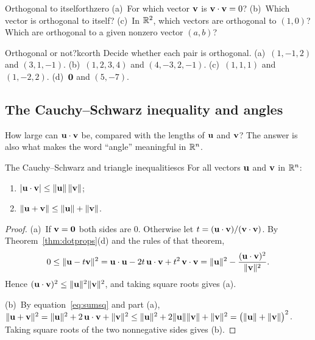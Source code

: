 \documentclass[11pt]{article}
\begin{document}
\begin{think}{Orthogonal to itself}{orthzero}
(a)~For which vector $\mathbf{v}$ is $\mathbf{v}\cdot\mathbf{v}=0$? (b)~Which vector is orthogonal to itself? (c)~In $\mathbb{R}^2$, which vectors are orthogonal to $(1,0)$? Which are orthogonal to a given nonzero vector $(a,b)$?
\end{think}

\begin{kc}{Orthogonal or not?}{kcorth}
Decide whether each pair is orthogonal. (a)~$(1,-1,2)$ and $(3,1,-1)$. (b)~$(1,2,3,4)$ and $(4,-3,2,-1)$. (c)~$(1,1,1)$ and $(1,-2,2)$. (d)~$\mathbf{0}$ and $(5,-7)$.
\end{kc}

\subsection*{The Cauchy--Schwarz inequality and angles}

How large can $\mathbf{u}\cdot\mathbf{v}$ be, compared with the lengths of $\mathbf{u}$ and $\mathbf{v}$? The answer is also what makes the word ``angle'' meaningful in $\mathbb{R}^n$.

\begin{thm}{The Cauchy--Schwarz and triangle inequalities}{cs}
For all vectors $\mathbf{u}$ and $\mathbf{v}$ in $\mathbb{R}^n$:
\begin{enumerate}[label=(\alph*),itemsep=1pt]
  \item $|\mathbf{u}\cdot\mathbf{v}|\le\lVert\mathbf{u}\rVert\,\lVert\mathbf{v}\rVert$;
  \item $\lVert\mathbf{u}+\mathbf{v}\rVert\le\lVert\mathbf{u}\rVert+\lVert\mathbf{v}\rVert$.
\end{enumerate}
\end{thm}

\begin{proof}
(a)~If $\mathbf{v}=\mathbf{0}$ both sides are $0$. Otherwise let $t=(\mathbf{u}\cdot\mathbf{v})/(\mathbf{v}\cdot\mathbf{v})$. By Theorem~\ref{thm:dotprops}(d) and the rules of that theorem,
\[
0\le\lVert\mathbf{u}-t\mathbf{v}\rVert^2=\mathbf{u}\cdot\mathbf{u}-2t\,\mathbf{u}\cdot\mathbf{v}+t^2\,\mathbf{v}\cdot\mathbf{v}=\lVert\mathbf{u}\rVert^2-\frac{(\mathbf{u}\cdot\mathbf{v})^2}{\lVert\mathbf{v}\rVert^2}.
\]
Hence $(\mathbf{u}\cdot\mathbf{v})^2\le\lVert\mathbf{u}\rVert^2\lVert\mathbf{v}\rVert^2$, and taking square roots gives (a).

(b)~By equation~\eqref{eq:sumsq} and part (a), $\lVert\mathbf{u}+\mathbf{v}\rVert^2=\lVert\mathbf{u}\rVert^2+2\,\mathbf{u}\cdot\mathbf{v}+\lVert\mathbf{v}\rVert^2\le\lVert\mathbf{u}\rVert^2+2\lVert\mathbf{u}\rVert\lVert\mathbf{v}\rVert+\lVert\mathbf{v}\rVert^2=\bigl(\lVert\mathbf{u}\rVert+\lVert\mathbf{v}\rVert\bigr)^2$. Taking square roots of the two nonnegative sides gives (b).
\end{proof}
\end{document}
